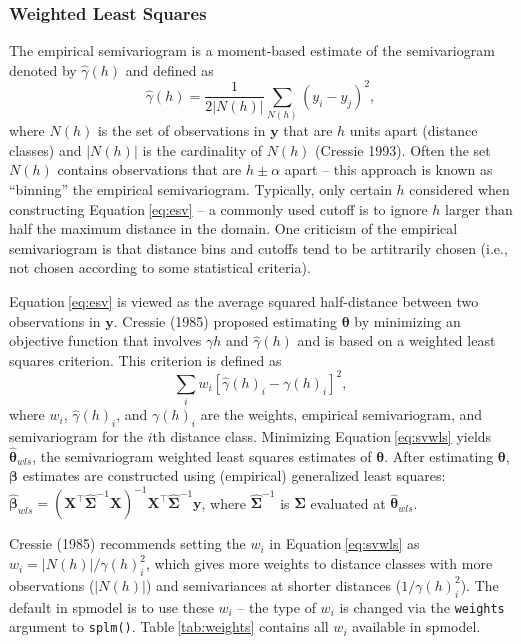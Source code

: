 \documentclass{article}
\begin{document}
\hypertarget{weighted-least-squares}{%
\subsubsection{Weighted Least Squares}\label{weighted-least-squares}}

The empirical semivariogram is a moment-based estimate of the
semivariogram denoted by \(\hat{\gamma}(h)\) and defined as
\begin{equation}\label{eq:esv}
  \hat{\gamma}(h) = \frac{1}{2|N(h)|} \sum_{N(h)} (y_i - y_j)^2, 
\end{equation} where \(N(h)\) is the set of observations in
\(\mathbf{y}\) that are \(h\) units apart (distance classes) and
\(|N(h)|\) is the cardinality of \(N(h)\) (Cressie 1993). Often the set
\(N(h)\) contains observations that are \(h \pm \alpha\) apart -- this
approach is known as ``binning'' the empirical semivariogram. Typically,
only certain \(h\) considered when constructing
Equation\(~\)\ref{eq:esv} -- a commonly used cutoff is to ignore \(h\)
larger than half the maximum distance in the domain. One criticism of
the empirical semivariogram is that distance bins and cutoffs tend to be
artitrarily chosen (i.e., not chosen according to some statistical
criteria).

Equation\(~\)\eqref{eq:esv} is viewed as the average squared
half-distance between two observations in \(\mathbf{y}\). Cressie (1985)
proposed estimating \(\bm{\theta}\) by minimizing an objective function
that involves \(\gamma{h}\) and \(\hat{\gamma}(h)\) and is based on a
weighted least squares criterion. This criterion is defined as
\begin{equation}\label{eq:svwls}
  \sum_i w_i [\hat{\gamma}(h)_i - \gamma(h)_i]^2,
\end{equation} where \(w_i\), \(\hat{\gamma}(h)_i\), and \(\gamma(h)_i\)
are the weights, empirical semivariogram, and semivariogram for the
\(i\)th distance class. Minimizing Equation\(~\)\eqref{eq:svwls} yields
\(\bm{\hat{\theta}}_{wls}\), the semivariogram weighted least squares
estimates of \(\bm{\theta}\). After estimating \(\bm{\theta}\),
\(\bm{\beta}\) estimates are constructed using (empirical) generalized
least squares:
\(\bm{\hat{\beta}}_{wls} = (\mathbf{X}^\intercal \hat{\mathbf{\Sigma}}^{-1} \mathbf{X})^{-1} \mathbf{X}^\intercal \hat{\mathbf{\Sigma}}^{-1} \mathbf{y}\),
where \(\hat{\mathbf{\Sigma}}^{-1}\) is \(\mathbf{\Sigma}\) evaluated at
\(\bm{\hat{\theta}}_{wls}\).

Cressie (1985) recommends setting the \(w_i\) in
Equation\(~\)\eqref{eq:svwls} as \(w_i = |N(h)| / \gamma(h)_i^2\), which
gives more weights to distance classes with more observations
(\(|N(h)|\)) and semivariances at shorter distances
(\(1 / \gamma(h)_i^2\)). The default in spmodel is to use these \(w_i\)
-- the type of \(w_i\) is changed via the \texttt{weights} argument to
\texttt{splm()}. Table\(~\)\ref{tab:weights} contains all \(w_i\)
available in spmodel.
\end{document}

